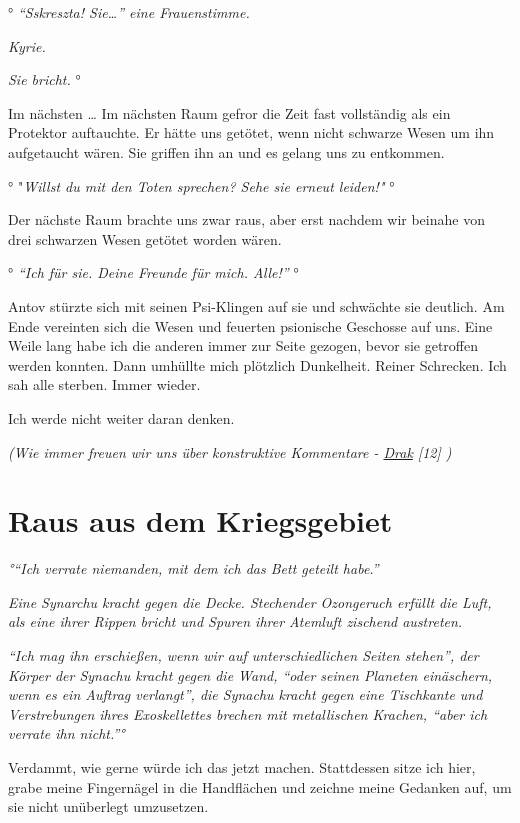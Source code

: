 \documentclass[11pt]{article}
\begin{document}
° \emph{``Sskreszta! Sie\ldots{}'' eine Frauenstimme.}

\emph{Kyrie.}

\emph{Sie bricht.} °

Im nächsten \ldots{} Im nächsten Raum gefror die Zeit fast vollständig
als ein Protektor auftauchte. Er hätte uns getötet, wenn nicht schwarze
Wesen um ihn aufgetaucht wären. Sie griffen ihn an und es gelang uns zu
entkommen.

° "\emph{Willst du mit den Toten sprechen? Sehe sie erneut leiden!"} °

Der nächste Raum brachte uns zwar raus, aber erst nachdem wir beinahe
von drei schwarzen Wesen getötet worden wären.

° \emph{``Ich für sie. Deine Freunde für mich. Alle!''} °

Antov stürzte sich mit seinen Psi-Klingen auf sie und schwächte sie
deutlich. Am Ende vereinten sich die Wesen und feuerten psionische
Geschosse auf uns. Eine Weile lang habe ich die anderen immer zur Seite
gezogen, bevor sie getroffen werden konnten. Dann umhüllte mich
plötzlich Dunkelheit. Reiner Schrecken. Ich sah alle sterben. Immer
wieder.

Ich werde nicht weiter daran denken.

\emph{(Wie immer freuen wir uns über konstruktive Kommentare -
\href{http://1w6.org/uzanto/drak}{Drak} {[}12{]} )}

\section{Raus aus dem Kriegsgebiet}

\emph{°``Ich verrate niemanden, mit dem ich das Bett geteilt habe.''}

\emph{Eine Synarchu kracht gegen die Decke. Stechender Ozongeruch
erfüllt die Luft, als eine ihrer Rippen bricht und Spuren ihrer Atemluft
zischend austreten.}

\emph{``Ich mag ihn erschießen, wenn wir auf unterschiedlichen Seiten
stehen'', der Körper der Synachu kracht gegen die Wand, ``oder seinen
Planeten einäschern, wenn es ein Auftrag verlangt'', die Synachu kracht
gegen eine Tischkante und Verstrebungen ihres Exoskellettes brechen mit
metallischen Krachen, ``aber ich verrate ihn nicht.''°}

Verdammt, wie gerne würde ich das jetzt machen. Stattdessen sitze ich
hier, grabe meine Fingernägel in die Handflächen und zeichne meine
Gedanken auf, um sie nicht unüberlegt umzusetzen.
\end{document}
